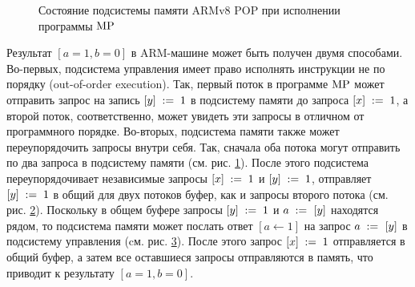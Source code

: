 \begin{figure}

\begin{subfigure}{.33\textwidth}
  \caption{}
  \label{fig:armvpop:mpstorage:1}
\end{subfigure}%
\begin{subfigure}{.33\textwidth}
  \caption{}
  \label{fig:armvpop:mpstorage:2}
\end{subfigure}%
\begin{subfigure}{.33\textwidth}
  \caption{}
  \label{fig:armvpop:mpstorage:3}
\end{subfigure}
\caption{Состояние подсистемы памяти ARMv8 POP при исполнении программы ${\rm MP}$}
\label{fig:armvpop:mpstorage}
\end{figure}

Результат $[a = 1, b = 0]$ в ARM-машине может быть получен двумя способами.
Во-первых, подсистема управления имеет право исполнять инструкции не по порядку (out-of-order execution).
Так, первый поток в программе ${\rm MP}$ может отправить запрос на запись $[y]\;:=\;1$ в подсистему памяти до запроса $[x]\;:=\;1$,
а второй поток, соответственно, может увидеть эти запросы в отличном от программного порядке.
Во-вторых, подсистема памяти также может переупорядочить запросы внутри себя.
Так, сначала оба потока могут отправить по два запроса в подсистему памяти (см. рис. \ref{fig:armvpop:mpstorage:1}).
После этого подсистема переупорядочивает независимые запросы $[x]\;:=\;1$ и $[y]\;:=\;1$, отправляет $[y]\;:=\;1$
в общий для двух потоков буфер, как и запросы второго потока (см. рис. \ref{fig:armvpop:mpstorage:2}).
Поскольку в общем буфере запросы $[y]\;:=\;1$ и $a \;:=_{}\;[y]$ находятся рядом, то подсистема памяти может послать
ответ $[a \leftarrow 1]$ на запрос $a \;:=_{}\;[y]$ в подсистему управления (cм. рис. \ref{fig:armvpop:mpstorage:3}).
После этого запрос $[x]\;:=\;1$ отправляется в общий буфер, а затем все оставшиеся запросы отправляются в память,
что приводит к результату $[a = 1, b = 0]$.

